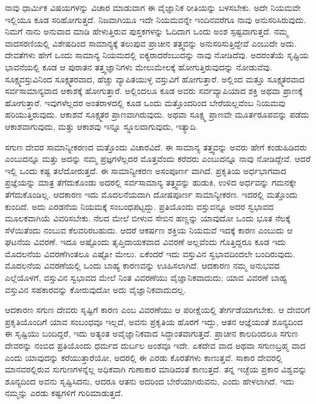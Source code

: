 ನಾವು ಧಾರ್ಮಿಕ ವಿಷಯಗಳನ್ನು ವಿಚಾರ ಮಾಡುವಾಗ ಈ ವೈಜ್ಞಾನಿಕ ರೀತಿಯನ್ನು ಬಳಸಬೇಕು. ಅದೇ ನಿಯಮವೇ ಇಲ್ಲಿಯೂ ಕೂಡ ಸರಿಹೋಗುತ್ತದೆ. ನಿಜವಾಗಿಯೂ ಇದೇ ನಿಯಮವನ್ನೇ ಇಂದಿನವರೆಗೂ ನಾವು ಅನುಸರಿಸಿರುವುದು. ನಿಮಗೆ ನಾನು ಅನುವಾದ ಮಾಡಿ ಹೇಳುತ್ತಿರುವ ಪುಸ್ತಕಗಳನ್ನು ಓದಿದಾಗ ಒಂದು ಅಂಶ ಸ್ಪಷ್ಟವಾಗುತ್ತದೆ. ನಮ್ಮ ವಾದಸರಣಿಯಲ್ಲಿ ವಿಶೇಷದಿಂದ ಸಾಮಾನ್ಯಕ್ಕೆ ತಲುಪುವ ಪ್ರಾಚೀನ ತತ್ತ್ವವನ್ನು ಅನುಸರಿಸುತ್ತಿದ್ದೇವೆ ಎಂಬುದೇ ಅದು. ದೇವತೆಗಳು ಹೇಗೆ ಒಂದು ಸಾಮಾನ್ಯ ನಿಯಮದಲ್ಲಿ ಐಕ್ಯರಾದರೆಂಬುದನ್ನು ನಾವು ನೋಡಿದೆವು. ಅದರಂತೆಯೆ ಸೃಷ್ಟಿಯ ಭಾವನೆಯಲ್ಲಿ ಕೂಡ ಆ ಪುರಾತನ ತತ್ತ್ವಜ್ಞಾನಿಗಳು ಮೇಲುಮೇಲಕ್ಕೆ ಹೋಗುತ್ತಿರುವುದನ್ನು ನೋಡುವೆವು. ಸೂಕ್ಷ್ಮವಸ್ತುವಿನಿಂದ ಸೂಕ್ಷ್ಮತರವಾದ, ಹೆಚ್ಚು ವ್ಯಾಪಿತಯುಳ್ಳ ವಸ್ತುವಿಗೆ ಹೋಗುತ್ತಾರೆ. ಅಲ್ಲಿಂದ ಮತ್ತೂ ಸೂಕ್ಷ್ಮತರವಾದ ಸರ್ವಸಾಮಾನ್ಯವಾದ ಆಕಾಶಕ್ಕೆ ಹೋಗುತ್ತಾರೆ. ಅಲ್ಲಿಂದಲೂ ಕೂಡ ಅವರು ಸರ್ವವ್ಯಾಪಿಯಾದ ಶಕ್ತಿ ಅಥವಾ ಪ್ರಾಣಕ್ಕೆ ಹೋಗುತ್ತಾರೆ. ಇವುಗಳೆಲ್ಲದರ ಅಂತರಾಳದಲ್ಲಿ ಕೂಡ ಒಂದು ಮತ್ತೊಂದರಿಂದ ಬೇರೆಯಲ್ಲವೆಂಬ ನಿಯಮವು ಹರಿಯುತ್ತಿರುವುದು. ಆಕಾಶವೆ ಸೂಕ್ಷ್ಮತರ ಪ್ರಾಣವಾಗಿರುವುದು. ಅಥವಾ ಸೂಕ್ಷ್ಮ ಪ್ರಾಣವೇ ಮೂರ್ತರೂಪವನ್ನು ಪಡೆದು ಆಕಾಶವಾಗುವುದು, ಮತ್ತು ಆಕಾಶವು ಇನ್ನೂ ಸ್ಥೂಲವಾಗುವುದು, ಇತ್ಯಾದಿ.

ಸಗುಣ ದೇವರ ಸಾಮಾನ್ಯೀಕರಣದ ಮತ್ತೊಂದು ವಿಚಾರವಿದೆ. ಈ ಸಾಮಾನ್ಯ ತತ್ತ್ವವನ್ನು ಅವರು ಹೇಗೆ ಕಂಡುಹಿಡಿದರು ಎಂಬುದನ್ನೂ ಮತ್ತು ಅದನ್ನು ನಮ್ಮ ಪ್ರಜ್ಞಗಳೆಲ್ಲದರ ಮೊತ್ತವೆಂದು ಕರೆದರು ಎಂಬುದನ್ನೂ ನಾವು ನೋಡಿದ್ದೇವೆ. ಆದರೆ ಇಲ್ಲಿ ಒಂದು ಕಷ್ಟ ತಲೆದೋರುತ್ತದೆ. ಈ ಸಾಮಾನ್ಯೀಕರಣ ಅಸಂಪೂರ್ಣ ವಾಗಿದೆ. ಪ್ರಕೃತಿಯ ಅರ್ಧಭಾಗವಾದ ಪ್ರಜ್ಞೆಯನ್ನು ಮಾತ್ರ ತೆಗೆದುಕೊಂಡು ಅದರಲ್ಲಿ ಸರ್ವಸಾಮಾನ್ಯ ತತ್ತ್ವವನ್ನು ಹುಡುಕಿ, ಉಳಿದ ಅರ್ಧವನ್ನು ಗಮನಕ್ಕೇ ತೆಗೆದುಕೊಂಡಿಲ್ಲ. ಆದಕಾರಣ ಇದು ಮೊದಲನೆಯದಾಗಿ ದೋಷಪೂರ್ಣ ಸಾಮಾನ್ಯೀಕರಣ. ಇದರಲ್ಲಿ ಮತ್ತೊಂದು ಕುಂದಿದೆ. ಅದು ಎರಡನೆಯ ನಿಯಮಕ್ಕೆ ಸಂಬಂಧಪಟ್ಟದ್ದು. ಪ್ರತಿಯೊಂದು ವಸ್ತುವನ್ನೂ ಅದರ ಸ್ವಭಾವದ ಮೂಲಕವಾಗಿಯೆ ವಿವರಿಸಬೇಕು. ನೆಲದ ಮೇಲೆ ಬೀಳುವ ಸೇಬಿನ ಹಣ್ಣನ್ನು ಯಾವುದೋ ಒಂದು ಭೂತ ನೆಲಕ್ಕೆ ಸೆಳೆಯಿತೆಂದು ನಂಬುವ ಕೆಲವರಿರಬಹುದು. ಆದರೆ ಆಕರ್ಷಣ ಶಕ್ತಿಯ ನಿಯಮವೆ ಇದಕ್ಕೆ ಕಾರಣ ಎಂಬುದು ಆ ಘಟನೆಯ ವಿವರಣೆ. ಇದೂ ಅಷ್ಟೊಂದು ತೃಪ್ತಿದಾಯಕವಾದ ವಿವರಣೆ ಅಲ್ಲವೆಂದು ಗೊತ್ತಿದ್ದರೂ ಕೂಡ ಇದು ಮೊದಲನೆಯ ವಿವರಣೆಗಿಂತಲೂ ಎಷ್ಟೋ ಮೇಲು. ಏಕೆಂದರೆ ಇದು ವಸ್ತುವಿನ ಸ್ವಭಾವದಿಂದಲೇ ಬಂದಿರುವುದು. ಮೊದಲನೆಯ ವಿವರಣೆಯಲ್ಲಿ ಒಂದು ಬಾಹ್ಯ ಕಾರಣವನ್ನು ಊಹಿಸಲಾಗಿದೆ. ಆದಕಾರಣ ನಮ್ಮ ಅನುಭವದ ಎಲ್ಲೆಯೊಳಗೆ, ವಸ್ತುವಿನ ಸ್ವಭಾವದ ಮೇಲೆ ನಿಂತ ವಿವರಣೆಯು ವೈಜ್ಞಾನಿಕವಾದುದು; ಯಾವ ವಿವರಣೆ ಬಾಹ್ಯ ವಸ್ತುವಿನ ಸಹಕಾರವನ್ನು ಕೋರುವುದೋ ಅದು ವೈಜ್ಞಾನಿಕವಾದುದಲ್ಲ.

ಆದಕಾರಣ ಸಗುಣ ದೇವರು ಸೃಷ್ಟಿಗೆ ಕಾರಣ ಎಂಬ ವಿವರಣೆಯು ಆ ಪರೀಕ್ಷೆಯಲ್ಲಿ ತೇರ್ಗಡೆಯಾಗಬೇಕು. ಆ ದೇವರಿಗೆ ಪ್ರಕೃತಿಯೊಂದಿಗೆ ಯಾವ ಸಂಬಂಧವೂ ಇಲ್ಲದೆ, ಅವನು ಪ್ರಕೃತಿಯ ಹೊರಗೆ ಇದ್ದು, ಆತನ ಆಜ್ಞೆಯಂತೆ ಶೂನ್ಯದಿಂದ ಈ ಸೃಷ್ಟಿಯು ಬಂದಿದ್ದರೆ, ಇದು ಅತ್ಯಂತ ಅವೈಜ್ಞಾನಿಕವಾದ ಸಿದ್ಧಾಂತವಾಗುತ್ತದೆ. ಪ್ರಾಚೀನ ಕಾಲದಿಂದಲೂ ಸಗುಣ ದೇವರನ್ನು ನಂಬಿದ ಪ್ರತಿಯೊಂದು ಧರ್ಮದ ದುರ್ಬಲ ಅಂಶವೂ ಇದೇ. ಏಕದೇವ ವಾದ ಅಥವಾ ಸಗುಣಬ್ರಹ್ಮ ವಾದ ಎಂದು ಯಾವುದನ್ನು ಕರೆಯುತ್ತಾರೆಯೋ, ಅದರಲ್ಲಿ ಈ ಎರಡು ಕೊರತೆಗಳು ಕಾಣುತ್ತವೆ. ಸಾಕಾರ ದೇವರಲ್ಲಿ ಮಾನವರಲ್ಲಿರುವ ಸುಗುಣಗಳನ್ನೆಲ್ಲ ಅಧಿಕವಾಗಿ ಗುಣಾಕಾರ ಮಾಡಿದಂತೆ ಕಾಣುತ್ತದೆ. ತನ್ನ ಇಚ್ಛೆಯ ಪ್ರಕಾರ ವಿಶ್ವವನ್ನು ಶೂನ್ಯದಿಂದ ಅವನು ಸೃಷ್ಟಿಸಿದನು, ಆದರೂ ಆತನು ಅದರಿಂದ ಬೇರೆಯಾಗಿರುವನು, ಎಂದು ಹೇಳಲಾಗಿದೆ. ಇದು ನಮ್ಮನ್ನು ಎರಡು ಕಷ್ಟಗಳಿಗೆ ಗುರಿಮಾಡುತ್ತದೆ.

